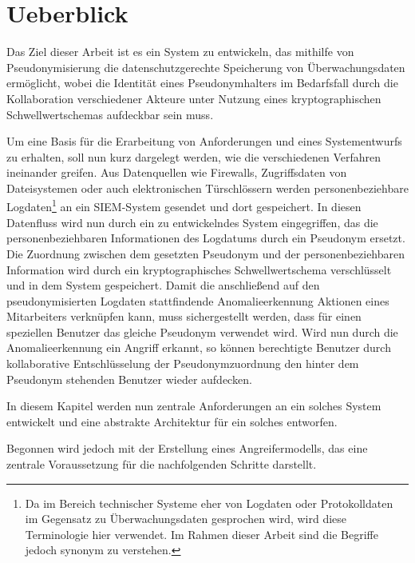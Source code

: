 \chapter{Ueberblick}

Das Ziel dieser Arbeit ist es ein System zu entwickeln, das mithilfe von Pseudonymisierung die datenschutzgerechte Speicherung von Überwachungsdaten ermöglicht, wobei die Identität eines Pseudonymhalters im Bedarfsfall durch die Kollaboration verschiedener Akteure unter Nutzung eines kryptographischen Schwellwertschemas aufdeckbar sein muss.

Um eine Basis für die Erarbeitung von Anforderungen und eines Systementwurfs zu erhalten, soll nun kurz dargelegt werden, wie die verschiedenen Verfahren ineinander greifen. Aus Datenquellen wie Firewalls, Zugriffsdaten von Dateisystemen oder auch elektronischen Türschlössern werden personenbeziehbare Logdaten\footnote{
  Da im Bereich technischer Systeme eher von Logdaten oder Protokolldaten im Gegensatz zu Überwachungsdaten gesprochen wird, wird diese Terminologie hier verwendet. Im Rahmen dieser Arbeit sind die Begriffe jedoch synonym zu verstehen.
} an ein SIEM-System gesendet und dort gespeichert. In diesen Datenfluss wird nun durch ein zu entwickelndes System eingegriffen, das die personenbeziehbaren Informationen des Logdatums durch ein Pseudonym ersetzt. Die Zuordnung zwischen dem gesetzten Pseudonym und der personenbeziehbaren Information wird durch ein kryptographisches Schwellwertschema verschlüsselt und in dem System gespeichert. Damit die anschließend auf den pseudonymisierten Logdaten stattfindende Anomalieerkennung Aktionen eines Mitarbeiters verknüpfen kann, muss sichergestellt werden, dass für einen speziellen Benutzer das gleiche Pseudonym verwendet wird. Wird nun durch die Anomalieerkennung ein Angriff erkannt, so können berechtigte Benutzer durch kollaborative Entschlüsselung der Pseudonymzuordnung den hinter dem Pseudonym stehenden Benutzer wieder aufdecken.

In diesem Kapitel werden nun zentrale Anforderungen an ein solches System entwickelt und eine abstrakte Architektur für ein solches entworfen.

Begonnen wird jedoch mit der Erstellung eines Angreifermodells, das eine zentrale Voraussetzung für die nachfolgenden Schritte darstellt.





